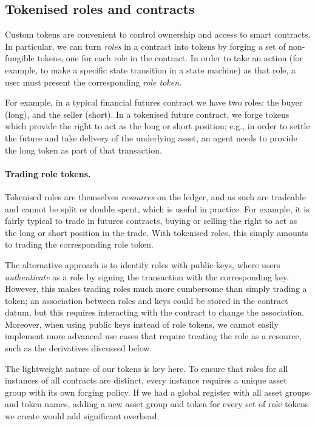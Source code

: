 \subsection{Tokenised roles and contracts}

Custom tokens are convenient to control ownership and access to smart contracts. In particular, we can turn \emph{roles} in a contract into tokens by forging a set of non-fungible tokens, one for each role in the contract. In order to take an action (for example, to make a specific state transition in a state machine) as that role, a user must present the corresponding \emph{role token}.

For example, in a typical financial futures contract we have two roles: the buyer (long), and the seller (short).
In a tokenised future contract, we forge tokens which provide the right to act as the long or short position; e.g., in order to settle the future and take delivery of the underlying asset, an agent needs to provide the long token as part of that transaction.

\paragraph{Trading role tokens.}
%
Tokenised roles are themselves \emph{resources} on the ledger, and as such are tradeable and cannot be split or double spent,
which is useful in practice.
For example, it is fairly typical to trade in futures contracts, buying or selling the right to act as the long or short position in the trade.
With tokenised roles, this simply amounts to trading the corresponding role token.

The alternative approach is to identify roles with public keys, where users \emph{authenticate} as a role by signing the transaction with the corresponding key.
However, this makes trading roles much more cumbersome than simply trading a token;
an association between roles and keys could be stored in the contract datum, but this requires interacting with the contract to change the association.
Moreover, when using public keys instead of role tokens, we cannot easily implement more advanced use cases that require treating the role as a resource, such as the derivatives discussed below.

The lightweight nature of our tokens is key here.
To ensure that roles for all instances of all contracts are distinct, every instance  requires a unique asset group with its own forging policy.
If we had a global register with all asset groups and token names, adding a new asset group and token for every set of role tokens we create would add significant overhead.

